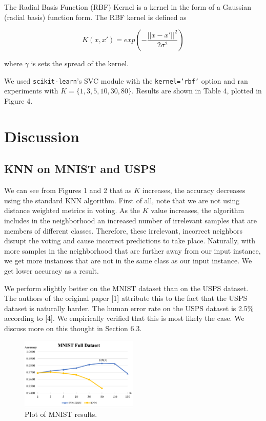 \documentclass[11pt,letterpaper]{article}
\begin{document}
The Radial Basis Function (RBF) Kernel is a kernel in the form of a Gaussian (radial basis) function form. The RBF kernel is defined as 

$$K(x, x') = exp\left(-\frac{||x-x'||^2}{2\sigma^2}\right)$$

where $\gamma$ is sets the spread of the kernel.

We used {\tt scikit-learn}'s SVC module with the {\tt kernel='rbf'} option and ran experiments with $K=\{1,3,5,10,30,80\}$. Results are shown in Table 4, plotted in Figure 4.

\section{Discussion}

\subsection{KNN on MNIST and USPS}

We can see from Figures 1 and 2 that as $K$ increases, the accuracy decreases using the standard KNN algorithm. First of all, note that we are not using distance weighted metrics in voting. As the $K$ value increases, the algorithm includes in the neighborhood an increased number of irrelevant samples that are members of different classes. Therefore, these irrelevant, incorrect neighbors disrupt the voting and cause incorrect predictions to take place. Naturally, with more samples in the neighborhood that are further away from our input instance, we get more instances that are not in the same class as our input instance. We get lower accuracy as a result.

We perform slightly better on the MNIST dataset than on the USPS dataset. The authors of the original paper [1] attribute this to the fact that the USPS dataset is naturally harder. The human error rate on the USPS dataset is 2.5$\%$ according to [4]. We empirically verified that this is most likely the case. We discuss more on this thought in Section 6.3.

\begin{figure}[t!]
  \centering
  \includegraphics[keepaspectratio, width=0.5\textwidth]{mnist_full.png}
  \caption{Plot of MNIST results.}
\end{figure}
\end{document}
